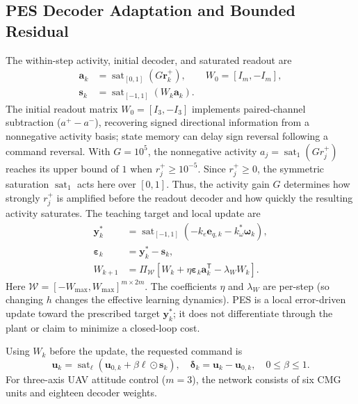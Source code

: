 \documentclass[letterpaper, 10 pt, conference]{ieeeconf}
\newcommand{\T}{^{\mathsf T}}
\newcommand{\sat}{\operatorname{sat}}
\begin{document}
\subsection{PES Decoder Adaptation and Bounded Residual}

The within-step activity, initial decoder, and saturated readout are
\begin{equation}
 \begin{aligned}
 \bm a_k&=\sat_{[0,1]}(G\bm r_k^+),\qquad W_0=[I_m,-I_m],\\
 \bm s_k&=\sat_{[-1,1]}(W_k\bm a_k).
 \end{aligned}
 \label{eq:readout}
\end{equation}
The initial readout matrix $W_0=[I_3,-I_3]$ implements paired-channel
subtraction ($a^+-a^-$), recovering signed directional information from
a nonnegative activity basis; state memory can delay sign reversal
following a command reversal. With $G=10^5$, the nonnegative activity
$a_j=\sat_{1}(G r_j^+)$ reaches its upper bound of $1$
when $r_j^+\ge10^{-5}$. Since $r_j^+\ge0$, the symmetric
saturation $\sat_{1}$ acts here over $[0,1]$. Thus, the activity
gain $G$ determines how strongly $r_j^+$ is amplified before the
readout decoder and how quickly the resulting activity saturates. The teaching target and local update are
\begin{align}
 \bm y_k^*&=\sat_{[-1,1]}(-k_e\bm e_{q,k}-k_\omega^*\bm\omega_k),\\
 \bm\varepsilon_k&=\bm y_k^*-\bm s_k,\\
 W_{k+1}&=\Pi_{\mathcal W}
       [W_k+\eta\bm\varepsilon_k\bm a_k\T-\lambda_W W_k].
 \label{eq:pes}
\end{align}
Here $\mathcal W=[-W_{\max},W_{\max}]^{m\times2m}$. The coefficients $\eta$ and $\lambda_W$ are per-step (so changing $h$ changes the effective learning dynamics). PES is a local error-driven update toward the prescribed target $\bm y_k^*$; it does not differentiate through the plant or claim to minimize a closed-loop cost.

Using $W_k$ before the update, the requested command is
\begin{equation}
 \bm u_k=\sat_{\bm\ell}(\bm u_{0,k}+\beta\bm\ell\odot\bm s_k),\quad
 \bm\delta_k=\bm u_k-\bm u_{0,k},\quad 0\le\beta\le1.
 \label{eq:residual}
\end{equation}
For three-axis UAV attitude control ($m=3$), the network consists of
six CMG units and eighteen decoder weights.
\end{document}

